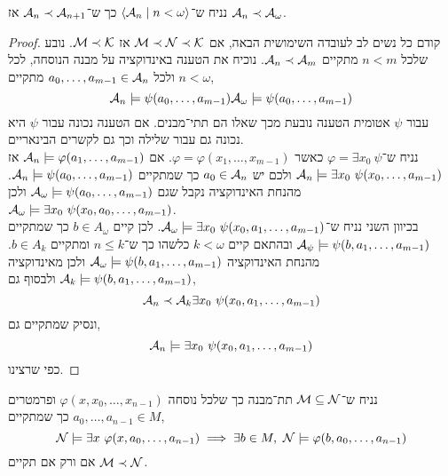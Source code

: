 \begin{theorem}
	נניח ש־$\langle \mathcal{A}_n \mid n < \omega \rangle$ כך ש־$\mathcal{A}_n \prec \mathcal{A}_{n + 1}$ אז $\mathcal{A}_n \prec \mathcal{A}_{\omega}$.
\end{theorem}
\begin{proof}
	קודם כל נשים לב לעובדה השימושית הבאה, אם $\mathcal{M} \prec \mathcal{N} \prec \mathcal{K}$ אז $\mathcal{M} \prec \mathcal{K}$.
	נובע שלכל $n < m$ מתקיים $\mathcal{A}_n \prec \mathcal{A}_m$.
	נוכיח את הטענה באינדוקציה על מבנה הנוסחה, לכל $n < \omega$ ולכל $a_0, \ldots, a_{m - 1} \in \mathcal{A}_n$ מתקיים,
	\[
		\mathcal{A}_n \models \psi(a_0, \ldots, a_{m - 1})
		\mathcal{A}_{\omega} \models \psi(a_0, \ldots, a_{m - 1})
	\]
	עבור $\psi$ אטומית הטענה נובעת מכך שאלו הם תתי־מבנים.
	אם הטענה נכונה עבור $\psi$ היא נכונה גם עבור שלילה וכך גם לקשרים הבינאריים. \\
	נניח ש־$\varphi = \exists x_0\ \psi$ כאשר $\varphi = \varphi(x_1, \ldots, x_{m - 1})$.
	אם $\mathcal{A}_n \models \varphi(a_1, \ldots, a_{m - 1})$ אז $\Aa_n \models \exists x_0\ \psi(x_0, \ldots, a_{m - 1})$ ולכם יש $a_0 \in \mathcal{A}_n$ כך שמתקיים $\mathcal{A}_n \models \psi(a_0, \ldots, a_{m - 1})$.
	מהנחת האינדוקציה נקבל שגם $\mathcal{A}_{\omega} \models \psi(a_0, \ldots, a_{m - 1})$ ולכן $\mathcal{A}_{\omega} \models \exists x_0\ \psi(x_0, a_0, \ldots, a_{m - 1})$. \\
	בכיוון השני נניח ש־$\mathcal{A}_{\omega} \models \exists x_0\ \psi(x_0, a_1, \ldots, a_{m - 1})$.
	לכן קיים $b \in A_{\omega}$ כך שמתקיים $\mathcal{A}_{\psi} \models \psi(b, a_1, \ldots, a_{m - 1})$ ובהתאם קיים $k < \omega$ כלשהו כך ש־$n \le k$ ומתקיים $b \in A_k$.
	מהנחת האינדוקציה $\mathcal{A}_{\omega} \models \psi(b, a_1, \ldots, a_{m - 1})$ ולכן מאינדוקציה $\mathcal{A}_k \models \psi(b, a_1, \ldots, a_{m - 1})$ ולבסוף גם,
	\[
		\mathcal{A}_n \prec \mathcal{A}_k \exists x_0\ \psi(x_0, a_1, \ldots, a_{m - 1})
	\]
	ונסיק שמתקיים גם,
	\[
		\mathcal{A}_n \models \exists x_0\ \psi(x_0, a_1, \ldots, a_{m - 1})
	\]
	כפי שרצינו.
\end{proof}
\begin{theorem}
	נניח ש־$\mathcal{M} \subseteq \mathcal{N}$ תת־מבנה כך שלכל נוסחה $\varphi(x, x_0, \ldots, x_{n - 1})$ ופרמטרים $a_0, \ldots, a_{n - 1} \in M$ כך שמתקיים,
	\[
		\Nn \models \exists x\ \varphi(x, a_0, \ldots, a_{n - 1})
		\implies \exists b \in M,\ \Nn \models \varphi(b, a_0, \ldots, a_{n - 1})
	\]
	אם ורק אם תקיים $\mathcal{M} \prec \mathcal{N}$.
\end{theorem}
